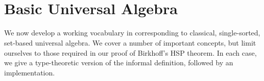 \begin{code}%
\>[0]\AgdaSpace{}%
\AgdaModule{\AgdaUnderscore{}}\AgdaSpace{}%
\AgdaSymbol{\{}\AgdaSpace{}%
\AgdaSymbol{:}\AgdaSpace{}%
\AgdaSpace{}%
\AgdaSpace{}%
\AgdaSymbol{\}\{}\AgdaSpace{}%
\AgdaSymbol{:}\AgdaSpace{}%
\AgdaSpace{}%
\AgdaSpace{}%
\AgdaSymbol{\}}\AgdaSpace{}%
\<%
\\
\>[0][@{}l@{\AgdaIndent{0}}]%
\>[1]\AgdaSpace{}%
\AgdaSpace{}%
\AgdaSpace{}%
\AgdaSpace{}%
\AgdaSymbol{()}\AgdaSpace{}%
\AgdaSpace{}%
\AgdaSymbol{(}\AgdaSpace{}%
\AgdaSpace{}%
\AgdaSpace{}%
\AgdaSpace{}%
\AgdaSymbol{)}\<%
\end{code}
\fi
\begin{code}%
%
\>[1]\AgdaSpace{}%
\AgdaSymbol{:}\AgdaSpace{}%
\AgdaSymbol{(}\AgdaSpace{}%
\AgdaSpace{}%
\AgdaSymbol{)}\AgdaSpace{}%
\AgdaSpace{}%
\AgdaSpace{}%
\AgdaSymbol{(}\AgdaSpace{}%
\AgdaSpace{}%
\AgdaSymbol{)}\AgdaSpace{}%
\<%
\\
%
\>[1]\AgdaSpace{}%
\AgdaSpace{}%
\AgdaSymbol{(}\AgdaSpace{}%
\AgdaOperator{\AgdaInductiveConstructor{,}}\AgdaSpace{}%
\AgdaSymbol{)}\AgdaSpace{}%
\AgdaSymbol{=}\AgdaSpace{}%
\AgdaSpace{}%
\AgdaSpace{}%
\AgdaSpace{}%
\AgdaSpace{}%
\AgdaSpace{}%
\AgdaSpace{}%
\AgdaSpace{}%
\AgdaSpace{}%
\AgdaSpace{}%
\AgdaSpace{}%
\AgdaSpace{}%
\AgdaSpace{}%
\AgdaSymbol{(}\AgdaSpace{}%
\AgdaSpace{}%
\AgdaSymbol{)}\<%
\end{code}



\section{Basic Universal Algebra}
\label{basic-universal-algebra}
We now develop a working vocabulary in \mltt corresponding to classical,
single-sorted, set-based universal algebra.
We cover a number of important concepts, but limit ourselves to those
required in our proof of Birkhoff's HSP theorem.
In each case, we give a type-theoretic version of the informal definition,
followed by an \agda implementation.

